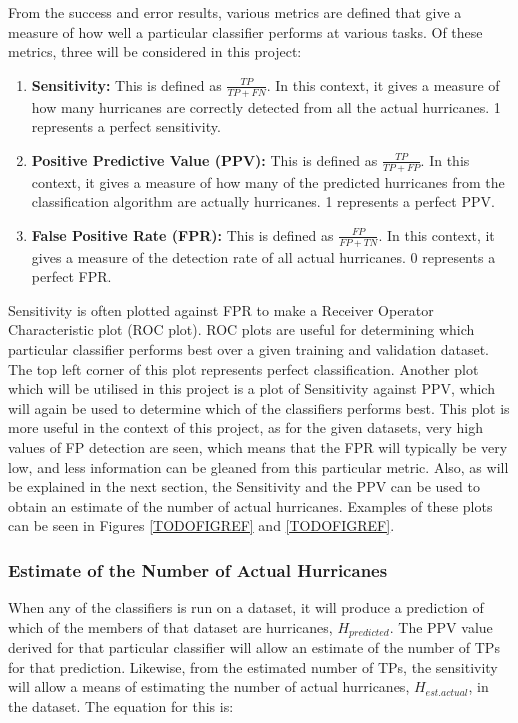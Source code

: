 \documentclass[pdftex,12pt,a4paper]{report}
\begin{document}
From the success and error results, various metrics are defined that give a measure of how well a
particular classifier performs at various tasks. Of these metrics, three will be considered in this
project:

\begin{enumerate}
    \item \textbf{Sensitivity:} This is defined as $\frac{TP}{TP + FN}$. In this context, it gives a
        measure of how many hurricanes are correctly detected from all the actual hurricanes. 1
        represents a perfect sensitivity.
    \item \textbf{Positive Predictive Value (PPV):} This is defined as $\frac{TP}{TP + FP}$. In this
        context, it gives a measure of how many of the predicted hurricanes from the classification
        algorithm are actually hurricanes. 1 represents a perfect PPV.
    \item \textbf{False Positive Rate (FPR):} This is defined as $\frac{FP}{FP + TN}$. In this
        context, it gives a measure of the detection rate of all actual hurricanes. 0 represents a
        perfect FPR.
\end{enumerate}

Sensitivity is often plotted against FPR to make a Receiver Operator Characteristic plot (ROC plot).
ROC plots are useful for determining which particular classifier performs best over a given training
and validation dataset. The top left corner of this plot represents perfect classification.  Another
plot which will be utilised in this project is a plot of Sensitivity against PPV, which will again
be used to determine which of the classifiers performs best. This plot is more useful in the context
of this project, as for the given datasets, very high values of FP detection are seen, which means
that the FPR will typically be very low, and less information can be gleaned from this particular
metric. Also, as will be explained in the next section, the Sensitivity and the PPV can be used to
obtain an estimate of the number of actual hurricanes. Examples of these plots can be seen in
Figures \ref{TODOFIGREF} and \ref{TODOFIGREF}.

\subsubsection{Estimate of the Number of Actual Hurricanes}

When any of the classifiers is run on a dataset, it will produce a prediction of which of the
members of that dataset are hurricanes, $H_{predicted}$. The PPV value derived for that particular classifier will
allow an estimate of the number of TPs for that prediction. Likewise, from the estimated number of
TPs, the sensitivity will allow a means of estimating the number of actual hurricanes, $H_{est. actual}$,
in the dataset. The equation for this is:
\end{document}
